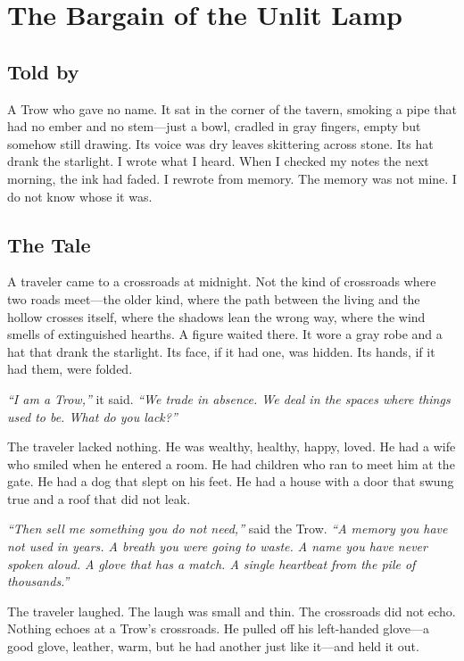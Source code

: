 \chapter{The Bargain of the Unlit Lamp}

\section*{Told by}
A Trow who gave no name. It sat in the corner of the tavern, smoking a pipe that had no ember and no stem---just a bowl, cradled in gray fingers, empty but somehow still drawing. Its voice was dry leaves skittering across stone. Its hat drank the starlight. I wrote what I heard. When I checked my notes the next morning, the ink had faded. I rewrote from memory. The memory was not mine. I do not know whose it was.

\section*{The Tale}

A traveler came to a crossroads at midnight. Not the kind of crossroads where two roads meet---the older kind, where the path between the living and the hollow crosses itself, where the shadows lean the wrong way, where the wind smells of extinguished hearths. A figure waited there. It wore a gray robe and a hat that drank the starlight. Its face, if it had one, was hidden. Its hands, if it had them, were folded.

\textit{``I am a Trow,''} it said. \textit{``We trade in absence. We deal in the spaces where things used to be. What do you lack?''}

The traveler lacked nothing. He was wealthy, healthy, happy, loved. He had a wife who smiled when he entered a room. He had children who ran to meet him at the gate. He had a dog that slept on his feet. He had a house with a door that swung true and a roof that did not leak.

\textit{``Then sell me something you do not need,''} said the Trow. \textit{``A memory you have not used in years. A breath you were going to waste. A name you have never spoken aloud. A glove that has a match. A single heartbeat from the pile of thousands.''}

The traveler laughed. The laugh was small and thin. The crossroads did not echo. Nothing echoes at a Trow's crossroads. He pulled off his left-handed glove---a good glove, leather, warm, but he had another just like it---and held it out.

